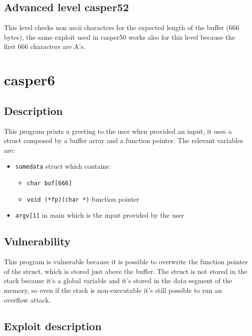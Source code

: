 \documentclass[a4paper,12pt]{article}
\begin{document}
\subsection{Advanced level casper52}

This level checks non ascii characters for the expected length of the buffer (666 bytes), the same exploit used in casper50 works also for this level because the first 666 characters are A's.

\section{casper6}


\subsection{Description}

This program prints a greeting to the user when provided an input, it uses a struct composed by a buffer array and a function pointer. The relevant variables are:
\begin{itemize}

\item \texttt{somedata} struct which contains:
		\begin{itemize}
		\item \texttt{char buf[666]}
		\item \texttt{void (*fp)(char *)} function pointer
		\end{itemize}
\item \texttt{argv[1]} in main which is the input provided by the user
\end{itemize}

\subsection{Vulnerability}

This program is vulnerable because it is possible to overwrite the function pointer of the struct, which is stored just above the buffer. The struct is not stored in the stack because it's a global variable and it's stored in the data segment of the memory, so even if the stack is non-executable it's still possible to run an overflow attack.


\subsection{Exploit description}
\end{document}
